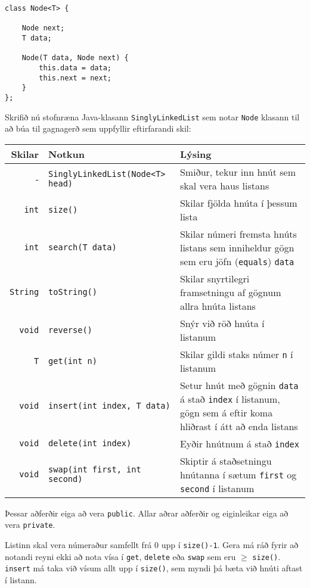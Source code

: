\documentclass{article}
\begin{document}
\begin{verbatim}
class Node<T> {

    Node next;
    T data;

    Node(T data, Node next) {
        this.data = data;
        this.next = next;
    }
};
\end{verbatim}

Skrifið nú stofnræna Java-klasann \texttt{SinglyLinkedList} sem notar \texttt{Node} klasann til að búa til gagnagerð sem uppfyllir eftirfarandi skil:

\begin{center}
\begin{tabularx}{\linewidth}{rlX}
\toprule
Skilar&Notkun&Lýsing\\
\midrule
-&\texttt{SinglyLinkedList(Node<T> head)}& Smiður, tekur inn hnút sem skal vera haus listans\\
\texttt{int}&\texttt{size()}&Skilar fjölda hnúta í þessum lista\\
\texttt{int}&\texttt{search(T data)}&Skilar númeri fremsta hnúts listans sem inniheldur gögn sem eru jöfn (\texttt{equals}) \texttt{data}\\
\texttt{String}&\texttt{toString()}&Skilar snyrtilegri framsetningu af gögnum allra hnúta listans\\
\texttt{void}&\texttt{reverse()}&Snýr við röð hnúta í listanum\\
\texttt{T}&\texttt{get(int n)}&Skilar gildi staks númer \texttt{n} í listanum\\
\texttt{void}&\texttt{insert(int index, T data)}&Setur hnút með gögnin \texttt{data} á stað \texttt{index} í listanum, gögn sem á eftir koma hliðrast í átt að enda listans\\
\texttt{void}&\texttt{delete(int index)}&Eyðir hnútnum á stað \texttt{index}\\
\texttt{void}&\texttt{swap(int first, int second)}&Skiptir á staðsetningu hnútanna í sætum \texttt{first} og \texttt{second} í listanum\\
\bottomrule
\end{tabularx}
\end{center}
Þessar aðferðir eiga að vera \texttt{public}. Allar aðrar aðferðir og eiginleikar eiga að vera \texttt{private}. 

Listinn skal vera númeraður samfellt frá $0$ upp í \texttt{size()-1}. Gera má ráð fyrir að notandi reyni ekki að nota vísa í \texttt{get}, \texttt{delete} eða \texttt{swap} sem eru $\geq$ \texttt{size()}. \texttt{insert} má taka við vísum allt upp í \texttt{size()}, sem myndi þá bæta við hnúti aftast í listann.
\end{document}
